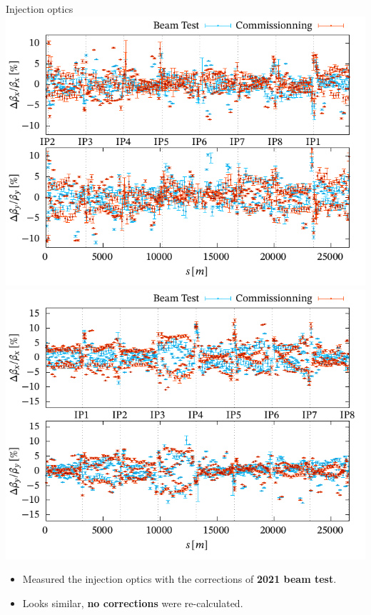 \documentclass[4pt,usenames,dvipsnames,aspectratio=169,table]{beamer}
\newcommand{\highl}[1]{\textbf{#1}}
\begin{document}


\begin{frame}{Injection optics}
    \includegraphics[width=0.49\linewidth]{images/beamtest/b1_bb.pdf}
    \hfill
    \includegraphics[width=0.49\linewidth]{images/beamtest/b2_bb.pdf}
    
    \begin{itemize}
        \item  Measured the injection optics with the corrections of \highl{2021 beam test}.
        \item Looks similar, \highl{no corrections} were re-calculated.
    \end{itemize}
\end{frame}


\end{document}
